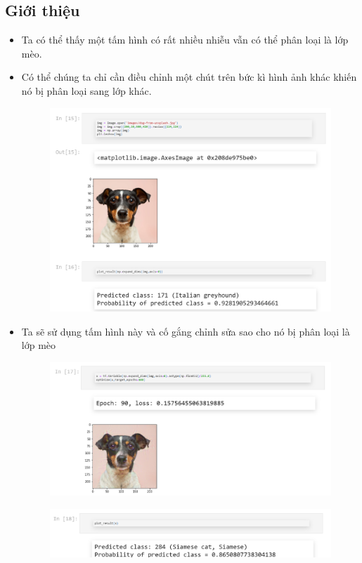 \documentclass{book}
\begin{document}
\subsection{Giới thiệu}
\begin{itemize}
	\item Ta có thể thấy một tấm hình có rất nhiều nhiễu vẫn có thể phân loại là lớp mèo.
	\item Có thể chúng ta chỉ cần điều chỉnh một chút trên bức kì hình ảnh khác khiến nó bị phân loại sang lớp khác.
	\begin{figure}[H]
		\centering
		\includegraphics[width=0.75\linewidth]{images/ad9_predict.png}
	\end{figure}
	\item Ta sẽ sử dụng tấm hình này và cố gắng chỉnh sửa sao cho nó bị phân loại là lớp mèo
	\begin{figure}[H]
		\centering
		\includegraphics[width=0.75\linewidth]{images/ad10_opti.png}
	\end{figure}
	\begin{figure}[H]
		\centering
		\includegraphics[width=0.75\linewidth]{images/ad11_predict.png}
	\end{figure}
\end{itemize}
\end{document}
